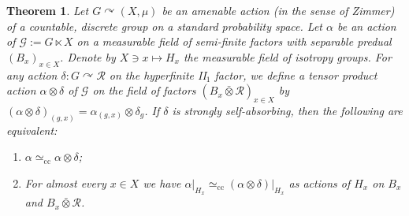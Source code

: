 \documentclass[11pt,a4paper]{article}
\newtheorem{theorem}{Theorem}
\theoremstyle{definition}
\theoremstyle{remark}
\numberwithin{equation}{section}
\numberwithin{theorem}{section}
\newcommand{\acts}{\curvearrowright}
\begin{document}
\begin{theorem} \label{thm:main_technical}
Let $G \acts (X,\mu)$ be an amenable action (in the sense of Zimmer) of a countable, discrete group on a standard probability space.
Let $\alpha$ be an action of ${\mathcal{G}:= G \ltimes X}$ on a measurable field of semi-finite factors with separable predual $(B_x)_{x \in X}$. 
Denote by ${X \ni x \mapsto H_x}$ the measurable field of isotropy groups. 
For any action ${\delta\colon G \acts \mathcal{R}}$ on the hyperfinite II$_1$ factor, we define a tensor product action $\alpha \otimes \delta$ of $\mathcal{G}$ on the field of factors $(B_x \bar{\otimes} \mathcal{R})_{x \in X}$ by $(\alpha \otimes \delta)_{(g,x)} = \alpha_{(g,x)} \otimes \delta_g$.
If $\delta$ is strongly self-absorbing, then the following are equivalent:
 \begin{enumerate}[leftmargin=*,label=\textup{(\arabic*)}]
 \item $\alpha \simeq_{\mathrm{cc}} \alpha \otimes \delta$; \label{prop:main_technical:1}
 \item For almost every $x \in X$ we have $\alpha{|_{H_x}} \simeq_{\mathrm{cc}} (\alpha \otimes \delta){|_{H_x}}$ as actions of $H_x$ on $B_x$ and $B_x \bar{\otimes} \mathcal{R}$. \label{prop:main_technical:2}
 \end{enumerate}
\end{theorem}
%
\end{document}

